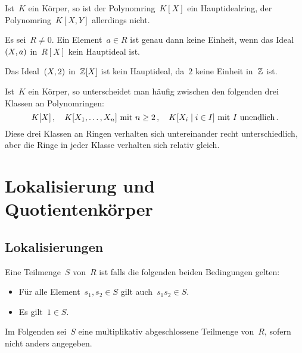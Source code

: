 \begin{example}
  Ist~$K$ ein Körper, so ist der Polynomring~$K[X]$ ein Hauptidealring, der Polynomring~$K[X,Y]$ allerdings nicht.
\end{example}

\begin{remark}
  Es sei~$R \neq 0$.
  Ein Element~$a \in R$ ist genau dann keine Einheit, wenn das Ideal~$(X, a)$ in~$R[X]$ kein Hauptideal ist.
\end{remark}

\begin{example}
  Das Ideal~$(X, 2)$ in~$\mathbb{Z}[X]$ ist kein Hauptideal, da~$2$ keine Einheit in~$\mathbb{Z}$ ist.
\end{example}

\begin{remark}
  Ist~$K$ ein Körper, so unterscheidet man häufig zwischen den folgenden drei Klassen an Polynomringen:
  \[
    K[X] \,,
    \quad
    \text{$K[X_1, \dotsc, X_n]$ mit~$n \geq 2$} \,,
    \quad
    \text{$K[X_i \suchthat i \in I]$ mit~$I$ unendlich} \,.
  \]
  Diese drei Klassen an Ringen verhalten sich untereinander recht unterschiedlich, aber die Ringe in jeder Klasse verhalten sich relativ gleich.
\end{remark}





\section{Lokalisierung und Quotientenkörper}



\subsection{Lokalisierungen}

\begin{definition}
  Eine Teilmenge~$S$ von~$R$ ist  falls die folgenden beiden Bedingungen gelten:
  \begin{itemize}
    \item
      Für alle Element~$s_1, s_2 \in S$ gilt auch~$s_1 s_2 \in S$.
    \item
      Es gilt~$1 \in S$.
  \end{itemize}
\end{definition}

\begin{convention}
  Im Folgenden sei~$S$ eine multiplikativ abgeschlossene Teilmenge von~$R$, sofern nicht anders angegeben.
\end{convention}

